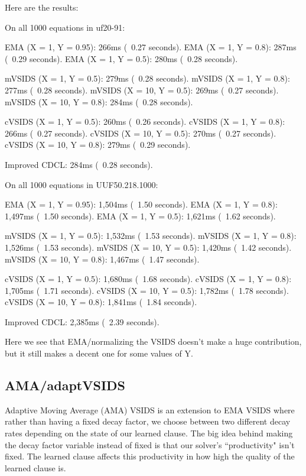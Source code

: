 \documentclass[../main.tex]{subfiles}
\begin{document}
Here are the results:
\begin{FVerbatim}
On all 1000 equations in uf20-91:

EMA (X = 1, Y = 0.95):      266ms (~0.27 seconds).
EMA (X = 1, Y = 0.8):       287ms (~0.29 seconds).
EMA (X = 1, Y = 0.5):       280ms (~0.28 seconds).

mVSIDS (X = 1, Y = 0.5):    279ms (~0.28 seconds).
mVSIDS (X = 1, Y = 0.8):    277ms (~0.28 seconds).
mVSIDS (X = 10, Y = 0.5):   269ms (~0.27 seconds).
mVSIDS (X = 10, Y = 0.8):   284ms (~0.28 seconds).

cVSIDS (X = 1, Y = 0.5):    260ms (~0.26 seconds).
cVSIDS (X = 1, Y = 0.8):    266ms (~0.27 seconds).
cVSIDS (X = 10, Y = 0.5):   270ms (~0.27 seconds).
cVSIDS (X = 10, Y = 0.8):   279ms (~0.29 seconds).

Improved CDCL:              284ms (~0.28 seconds).

On all 1000 equations in UUF50.218.1000:

EMA (X = 1, Y = 0.95):      1,504ms (~1.50 seconds).
EMA (X = 1, Y = 0.8):       1,497ms (~1.50 seconds).
EMA (X = 1, Y = 0.5):       1,621ms (~1.62 seconds).

mVSIDS (X = 1, Y = 0.5):    1,532ms (~1.53 seconds).
mVSIDS (X = 1, Y = 0.8):    1,526ms (~1.53 seconds).
mVSIDS (X = 10, Y = 0.5):   1,420ms (~1.42 seconds).
mVSIDS (X = 10, Y = 0.8):   1,467ms (~1.47 seconds).

cVSIDS (X = 1, Y = 0.5):    1,680ms (~1.68 seconds).
cVSIDS (X = 1, Y = 0.8):    1,705ms (~1.71 seconds).
cVSIDS (X = 10, Y = 0.5):   1,782ms (~1.78 seconds).
cVSIDS (X = 10, Y = 0.8):   1,841ms (~1.84 seconds).

Improved CDCL:              2,385ms (~2.39 seconds).
\end{FVerbatim}
\noindent
Here we see that EMA/normalizing the VSIDS doesn't make a huge contribution,
but it still makes a decent one for some values of Y.

\subsection{AMA/adaptVSIDS}

Adaptive Moving Average (AMA) VSIDS is an extension to EMA VSIDS where rather than 
having a fixed decay factor, we choose between two different decay rates depending on 
the state of our learned clause. The big idea behind making the decay factor variable 
instead of fixed is that our solver's ``productivity" isn't fixed. The learned clause 
affects this productivity in how high the quality of the learned clause is. 
\end{document}
